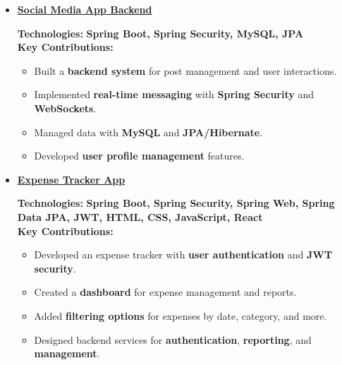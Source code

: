 \documentclass[11pt,a4paper,sans]{moderncv}        %
\begin{document}
\begin{itemize}
    \vspace{1pt}
    \item{\cventry
        {} 
        {\href{https://github.com/Rajmathur-8/social-media-app-backend}{\textbf{Social Media App Backend}}}
        {} 
        {} 
        {}
        {
            \vspace{3pt}
            \textbf{Technologies:} \textbf{Spring Boot, Spring Security, MySQL, JPA} \\
            \textbf{Key Contributions:}
            \begin{itemize}
                \item Built a \textbf{backend system} for post management and user interactions.
                \item Implemented \textbf{real-time messaging} with \textbf{Spring Security} and \textbf{WebSockets}.
                \item Managed data with \textbf{MySQL} and \textbf{JPA/Hibernate}.
                \item Developed \textbf{user profile management} features.
            \end{itemize}
        }
    }

    \vspace{1pt}
    \item{\cventry
        {} 
        {\href{https://github.com/Rajmathur-8/WalletWise}{\textbf{Expense Tracker App}}}
        {} 
        {} 
        {}
        {
            \vspace{3pt}
            \textbf{Technologies:} \textbf{Spring Boot, Spring Security, Spring Web, Spring Data JPA, JWT, HTML, CSS, JavaScript, React} \\
            \textbf{Key Contributions:}
            \begin{itemize}
                \item Developed an expense tracker with \textbf{user authentication} and \textbf{JWT security}.
                \item Created a \textbf{dashboard} for expense management and reports.
                \item Added \textbf{filtering options} for expenses by date, category, and more.
                \item Designed backend services for \textbf{authentication}, \textbf{reporting}, and \textbf{management}.
            \end{itemize}
        }
    }
\end{itemize}
\end{document}
